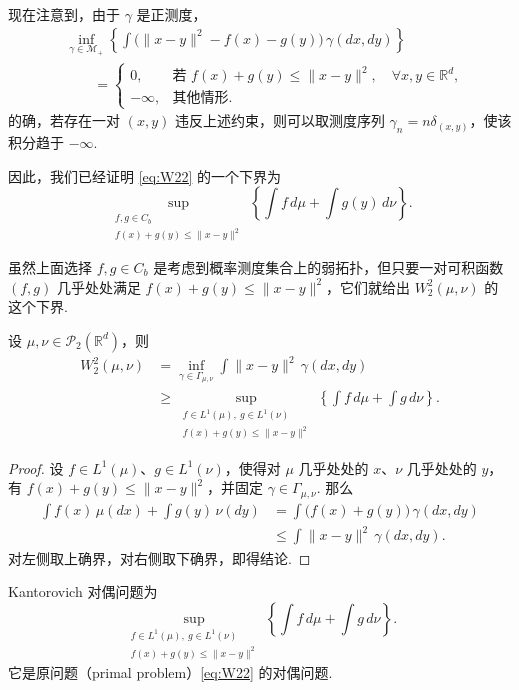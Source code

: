 现在注意到，由于 $\gamma$ 是正测度，
$$
\begin{aligned}
&\inf_{\gamma\in\mathcal{M}_+}\left\{
\int\bigl(\|x-y\|^2-f(x)-g(y)\bigr)\,\gamma(dx,dy)\right\}\\
&\qquad=\begin{cases}
0,&\text{若 }f(x)+g(y)\leq\|x-y\|^2,\quad\forall x,y\in\mathbb{R}^d,\\
-\infty,&\text{其他情形}.
\end{cases}
\end{aligned}
$$
的确，若存在一对 $(x,y)$ 违反上述约束，则可以取测度序列 $\gamma_n=n\delta_{(x,y)}$，使该积分趋于 $-\infty$.

因此，我们已经证明 \eqref{eq:W22} 的一个下界为
$$
\sup_{\substack{f,g\in C_b\\f(x)+g(y)\leq\|x-y\|^2}}
\left\{\int f\,d\mu+\int g(y)\,d\nu\right\}.
$$

虽然上面选择 $f,g\in C_b$ 是考虑到概率测度集合上的弱拓扑，但只要一对可积函数 $(f,g)$ 几乎处处满足 $f(x)+g(y)\leq\|x-y\|^2$，它们就给出 $W_2^2(\mu,\nu)$ 的这个下界.

\begin{lemma}\label{lem:1.12}
设 $\mu,\nu\in\mathcal{P}_2(\mathbb{R}^d)$，则
$$
\begin{aligned}
W_2^2(\mu,\nu)
&=\inf_{\gamma\in\Gamma_{\mu,\nu}}\int\|x-y\|^2\,\gamma(dx,dy)\\
&\geq\sup_{\substack{f\in L^1(\mu),\ g\in L^1(\nu)\\
f(x)+g(y)\leq\|x-y\|^2}}
\left\{\int f\,d\mu+\int g\,d\nu\right\}.
\end{aligned}
$$
\end{lemma}
\begin{proof}
设 $f\in L^1(\mu)$、$g\in L^1(\nu)$，使得对 $\mu$ 几乎处处的 $x$、$\nu$ 几乎处处的 $y$，有 $f(x)+g(y)\leq\|x-y\|^2$，并固定 $\gamma\in\Gamma_{\mu,\nu}$. 那么
$$
\begin{aligned}
\int f(x)\,\mu(dx)+\int g(y)\,\nu(dy)
&=\int\bigl(f(x)+g(y)\bigr)\,\gamma(dx,dy)\\
&\leq\int\|x-y\|^2\,\gamma(dx,dy).
\end{aligned}
$$
对左侧取上确界，对右侧取下确界，即得结论.
\end{proof}

Kantorovich 对偶问题为
\begin{equation}\tag{D-$W_2^2$}\label{eq:D-W22}
\sup_{\substack{f\in L^1(\mu),\ g\in L^1(\nu)\\
f(x)+g(y)\leq\|x-y\|^2}}
\left\{\int f\,d\mu+\int g\,d\nu\right\}.
\end{equation}
它是原问题（primal problem）\eqref{eq:W22} 的对偶问题.

